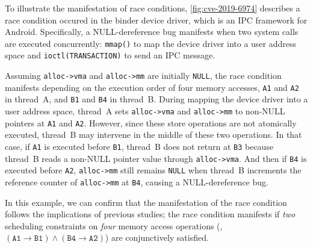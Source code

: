 To illustrate the manifestation of race conditions,
\autoref{fig:cve-2019-6974} describes a race condition occured in the
binder device driver, which is an IPC framework for
Android. Specifically, a NULL-dereference bug manifests when two
system calls are executed concurrently: \texttt{mmap()} to map the
device driver into a user address space and
\texttt{ioctl(TRANSACTION)} to send an IPC message.
 

Assuming \texttt{alloc->vma} and \texttt{alloc->mm} are initially
\texttt{NULL}, the race condition manifests depending on the execution
order of four memory accesses, \texttt{A1} and \texttt{A2} in
thread~A, and \texttt{B1} and \texttt{B4} in thread~B.
%
During mapping the device driver into a user address space, thread~A
sets \texttt{alloc->vma} and \texttt{alloc->mm} to non-NULL pointers
at \texttt{A1} and \texttt{A2}.
%
However, since these store operations are not atomically executed,
thread~B may intervene in the middle of these two operations.
%
In that case, if \texttt{A1} is executed before \texttt{B1}, thread~B
does not return at \texttt{B3} because thread~B reads a non-NULL
pointer value through \texttt{alloc->vma}.
%
And then if \texttt{B4} is executed before \texttt{A2},
\texttt{alloc->mm} still remains \texttt{NULL} when thread~B
increments the reference counter of \texttt{alloc->mm} at \texttt{B4},
causing a NULL-dereference bug.

In this example, we can confirm that the manifestation of the race
condition follows the implications of previous studies; the race
condition manifests if \textit{two} scheduling constraints on
\textit{four} memory access operations (\ie,
$(\texttt{A1} \rightarrow \texttt{B1}) \wedge (\texttt{B4} \rightarrow
\texttt{A2})$) are conjunctively satisfied.




